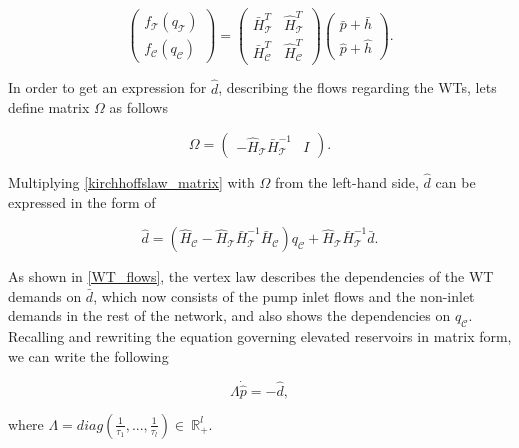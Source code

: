 \begin{equation}
\label{ohmslaw_matrixform11}
 \begin{pmatrix} 
 f_{\mathcal{T}}(q_\mathcal{T}) \\[3pt]
 f_{\mathcal{C}}(q_\mathcal{C}) 
 \end{pmatrix}
 =
 \begin{pmatrix}
   \bar{H}^T_{\mathcal{T}} & \hat{H}^T_{\mathcal{T}} \\[3pt]
   \bar{H}^T_{\mathcal{C}} & \hat{H}^T_{\mathcal{C}} 
   \end{pmatrix}
   \begin{pmatrix} 
 \bar{p} + \bar{h} \\[3pt] 
 \hat{p} + \hat{h} 
 \end{pmatrix}.
\end{equation}

In order to get an expression for $\hat{d}$, describing the flows regarding the WTs, lets define matrix $\Omega$ as follows

\begin{equation}
\label{omega_matrix}
\Omega
=
\begin{pmatrix} 
 -\hat{H}_{\mathcal{T}}  \bar{H}^{-1}_{\mathcal{T}}  & I  
 \end{pmatrix}.
\end{equation}

Multiplying \eqref{kirchhoffslaw_matrix} with $\Omega$ from the left-hand side, $\hat{d}$ can be expressed in the form of

\begin{equation}
\label{WT_flows}
\hat{d} = (\hat{H}_{\mathcal{C}} - \hat{H}_{\mathcal{T}} \bar{H}^{-1}_{\mathcal{T}}\bar{H}_{\mathcal{C}})  q_\mathcal{C}  + \hat{H}_{\mathcal{T}} \bar{H}^{-1}_{\mathcal{T}} \bar{d}.
\end{equation}

As shown in \eqref{WT_flows}, the vertex law describes the dependencies of the WT demands on $\bar{d}$, which now consists of the pump inlet flows and the non-inlet demands in the rest of the network, and also shows the dependencies on $q_\mathcal{C}$. Recalling and rewriting the equation governing elevated reservoirs in matrix form, we can write the following

\begin{equation}
\label{WT_matrixform}
\Lambda \dot{\hat{p}} = - \hat{d},
\end{equation}

where $\Lambda = diag(\frac{1}{\tau_1},... ,\frac{1}{\tau_l}) \in \: \mathbb{R}^l_+$. 

